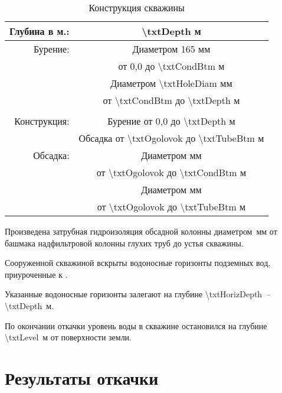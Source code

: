 \bigskip

\begin{table}[!h]
	\caption{Конструкция скважины}
	\centering
\begin{tabular}{rc}
	\hline 
	Глубина в м.: & {\num{\txtDepth}} м \\ 
	\hline 
	Бурение: & Диаметром 165 мм \\ 
	& от 0,0 до {\num{\txtCondBtm}} м \\ 
	& Диаметром {\num{\txtHoleDiam}} мм \\ 
	& от {\num{\txtCondBtm}} до {\num{\txtDepth}} м \\ 
	&  \\ 
	\hline 
	Конструкция: & Бурение от 0,0 до {\num{\txtDepth}} м \\ 
	& Обсадка от {\num{\txtOgolovok}} до {\num{\txtTubeBtm}} м \\ 
	\hline 
	Обсадка: & Диаметром {\txtCondDiam} мм \\ 
	& от {\num{\txtOgolovok}} до {\num{\txtCondBtm}} м \\ 
	& Диаметром {\txtTubeDiam} мм  \\ 
	& от {\num{\txtOgolovok}} до {\num{\txtTubeBtm}} м \\ 
	\hline 
\end{tabular} 
\end{table}

Произведена затрубная гидроизоляция обсадной колонны диаметром \txtTubeDiam \,мм от башмака надфильтровой колонны глухих труб до устья скважины.

Сооруженной скважиной вскрыты водоносные горизонты  подземных вод, приуроченные к \emph{\txtGeology}.

Указанные водоносные горизонты залегают на глубине   \num{\txtHorizDepth} \,– \num{\txtDepth} \,м.

По окончании откачки уровень воды в скважине остановился на глубине  \num{\txtLevel} \,м от поверхности земли.

\section{Результаты откачки}

